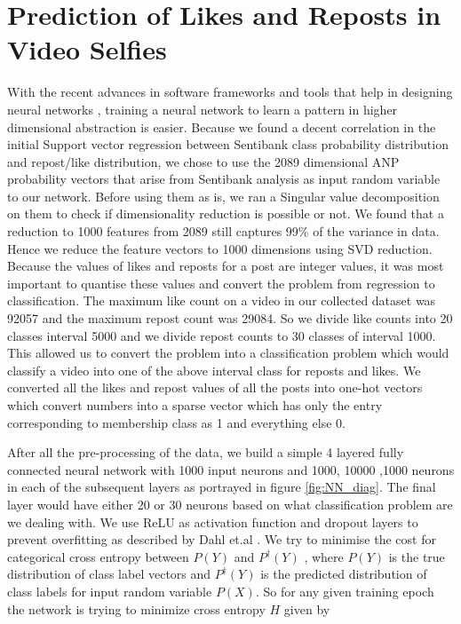 \section{Prediction of Likes and Reposts in Video Selfies}
With the recent advances in software frameworks and tools that help in designing neural networks \cite{Bastien-Theano-2012} \cite{bergstra+al:2010-scipy} , training a neural network to learn a pattern in higher dimensional abstraction is easier. Because we found a decent correlation in the initial Support vector regression between Sentibank class probability distribution and repost/like distribution, we chose to use the 2089 dimensional ANP probability vectors that arise from Sentibank analysis as input random variable to our network. Before using them as is, we ran a Singular value decomposition on them to check if dimensionality reduction is possible or not. We found that a reduction to 1000 features from 2089 still captures 99\% of the variance in data. Hence we reduce the feature vectors to 1000 dimensions using SVD reduction.  
Because the values of likes and reposts for a post are integer values, it was most important to quantise these values and convert the problem from regression to classification. The maximum like count on a video in our collected dataset was 92057 and the maximum repost count was 29084. So we divide like counts into 20 classes interval 5000 and we divide repost counts to 30 classes of interval 1000. This allowed us to convert the problem into a classification problem which would classify a video into one of the above interval class for reposts and likes. We converted all the likes and repost values of all the posts into one-hot vectors \cite{coates2011importance} which convert numbers into a sparse vector which has only the entry corresponding to membership class as 1 and everything else 0. 
\par
After all the pre-processing of the data, we build a simple 4 layered fully connected neural network with 1000 input neurons and 1000, 10000 ,1000 neurons in each of the subsequent layers as portrayed in figure \ref{fig:NN_diag}. The final layer would have either 20 or 30 neurons based on what classification problem are we dealing with. We use ReLU as activation function and dropout layers to prevent overfitting as described by Dahl et.al \cite{dahl2013improving}. 
We try to minimise the cost for categorical cross entropy between $ P(Y) $ and $P^{\dagger}(Y)$ , where $P(Y)$ is the true distribution of class label vectors and  $P^{\dagger}(Y)$ is the predicted distribution of class labels for input random variable $P(X)$. So for any given training epoch the network is trying to minimize cross entropy $H$ given by 
